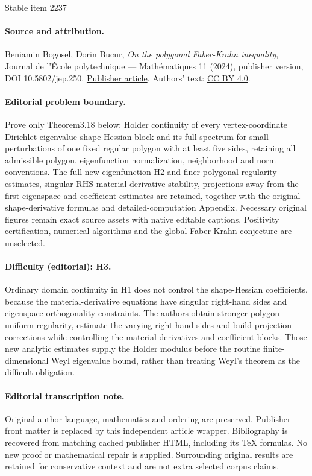 \documentclass[11pt]{article}
\numberwithin{equation}{section}\newtheorem*{jepEnonce}{\jepEnonceTitle}\newenvironment{enonce*}[1]{\def\jepEnonceTitle{#1}\jepEnonce}{\endjepEnonce}\newtheorem*{conj*}{Conjecture}
\theoremstyle{plain}
\theoremstyle{definition}
\begin{document}
\begin{center}{\Large Stable item 2237}\end{center}
\paragraph{Source and attribution.}
Beniamin Bogosel, Dorin Bucur, \emph{On the polygonal Faber-Krahn inequality}, Journal de l’École polytechnique — Mathématiques 11 (2024), publisher version, DOI 10.5802/jep.250. \href{https://jep.centre-mersenne.org/articles/10.5802/jep.250/}{Publisher article}. Authors' text: \href{https://creativecommons.org/licenses/by/4.0/}{CC BY 4.0}.
\paragraph{Editorial problem boundary.}
Prove only Theorem3.18 below: Holder continuity of every vertex-coordinate Dirichlet eigenvalue shape-Hessian block and its full spectrum for small perturbations of one fixed regular polygon with at least five sides, retaining all admissible polygon, eigenfunction normalization, neighborhood and norm conventions. The full new eigenfunction H2 and finer polygonal regularity estimates, singular-RHS material-derivative stability, projections away from the first eigenspace and coefficient estimates are retained, together with the original shape-derivative formulas and detailed-computation Appendix. Necessary original figures remain exact source assets with native editable captions. Positivity certification, numerical algorithms and the global Faber-Krahn conjecture are unselected.
\paragraph{Difficulty (editorial): H3.}
Ordinary domain continuity in H1 does not control the shape-Hessian coefficients, because the material-derivative equations have singular right-hand sides and eigenspace orthogonality constraints. The authors obtain stronger polygon-uniform regularity, estimate the varying right-hand sides and build projection corrections while controlling the material derivatives and coefficient blocks. Those new analytic estimates supply the Holder modulus before the routine finite-dimensional Weyl eigenvalue bound, rather than treating Weyl's theorem as the difficult obligation.
\paragraph{Editorial transcription note.}
Original author language, mathematics and ordering are preserved. Publisher front matter is replaced by this independent article wrapper. Bibliography is recovered from matching cached publisher HTML, including its TeX formulas. No new proof or mathematical repair is supplied. Surrounding original results are retained for conservative context and are not extra selected corpus claims.
\clearpage
\end{document}
